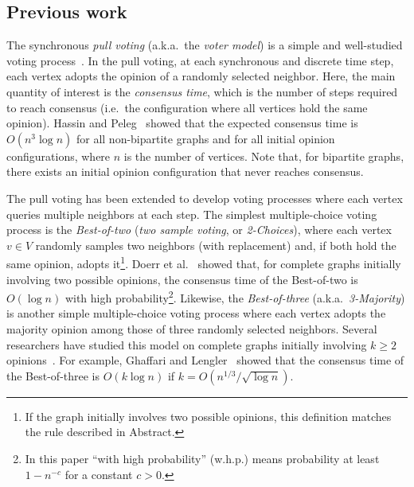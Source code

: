 \documentclass[letterpaper,11pt]{article}
\begin{document}
\subsection{Previous work}
The synchronous {\em pull voting} (a.k.a.~the {\em voter model}) is a simple and well-studied voting process~\cite{NIY99,HP01}.
In the pull voting, at each synchronous and discrete time step, each vertex adopts the opinion of a randomly selected neighbor. 
Here, the main quantity of interest is the {\em consensus time}, which is the number of steps required to reach consensus (i.e.~the configuration where all vertices hold the same opinion).
Hassin and Peleg~\cite{HP01} showed that the expected consensus time is $O(n^3\log n)$ for all non-bipartite graphs and for all initial opinion configurations, where $n$ is the number of vertices.
Note that, for bipartite graphs, there exists an initial opinion configuration that never reaches consensus.

The pull voting has been extended to develop voting processes where each vertex queries multiple neighbors at each step.
The simplest multiple-choice voting process is the {\em Best-of-two} ({\em two sample voting}, or {\em 2-Choices}), where each vertex $v\in V$ randomly samples two neighbors (with replacement) and, if both hold the same opinion, adopts it\footnote{If the graph initially involves two possible opinions, this definition matches the rule described in Abstract.}.
Doerr et al.~\cite{DGMSS11} showed that, for complete graphs initially involving two possible opinions, the consensus time of the Best-of-two is $O(\log n)$ with high probability\footnote{In this paper ``with high probability'' (w.h.p.) means probability at least $1-n^{-c}$ for a constant $c>0$.}.
%
Likewise, the {\em Best-of-three} (a.k.a.~{\em 3-Majority}) is another simple multiple-choice voting process where each vertex adopts the majority opinion among those of three randomly selected neighbors.
Several researchers have studied this model on complete graphs initially involving $k\geq 2$ opinions~\cite{BCNPT16, BCNPST17, BCEKMN17, GL18}.
For example, Ghaffari and Lengler~\cite{GL18} showed that the consensus time of the Best-of-three is $O(k\log n)$ if $k=O(n^{1/3}/\sqrt{\log n})$.
\end{document}
